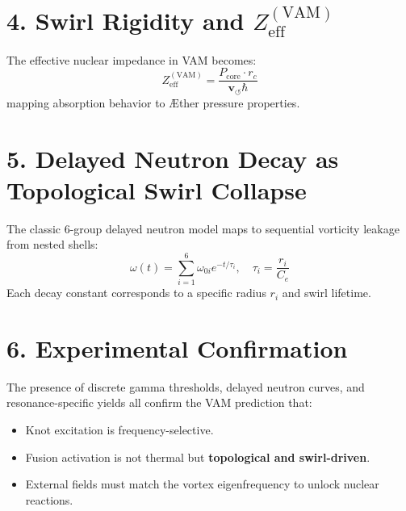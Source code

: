 \section*{4. Swirl Rigidity and $Z_{\mathrm{eff}}^{(\mathrm{VAM})}$}
The effective nuclear impedance in VAM becomes:
\[
Z_{\mathrm{eff}}^{(\mathrm{VAM})} = \frac{P_{\mathrm{core}} \cdot r_c}{\mathbf{v}_{\scriptscriptstyle\boldsymbol{\circlearrowleft}} \hbar}
\]
mapping absorption behavior to Æther pressure properties.
\section*{5. Delayed Neutron Decay as Topological Swirl Collapse}
The classic 6-group delayed neutron model maps to sequential vorticity leakage from nested shells:
\[
\omega(t) = \sum_{i=1}^6 \omega_{0i} e^{-t/\tau_i}, \quad \tau_i = \frac{r_i}{C_e}
\]
Each decay constant corresponds to a specific radius $r_i$ and swirl lifetime.
\section*{6. Experimental Confirmation}
The presence of discrete gamma thresholds, delayed neutron curves, and resonance-specific yields all confirm the VAM prediction that:
\begin{itemize}
  \item Knot excitation is frequency-selective.
  \item Fusion activation is not thermal but \textbf{topological and swirl-driven}.
  \item External fields must match the vortex eigenfrequency to unlock nuclear reactions.
\end{itemize}